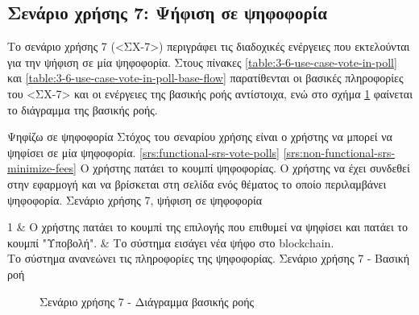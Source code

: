 \subsection{Σενάριο χρήσης 7: Ψήφιση σε ψηφοφορία} \label{subsection:3-6-use-case-vote-in-poll}

Το σενάριο χρήσης 7 (<ΣΧ-7>) περιγράφει τις διαδοχικές ενέργειες που εκτελούνται για την ψήφιση σε μία ψηφοφορία. Στους πίνακες \ref{table:3-6-use-case-vote-in-poll} και \ref{table:3-6-use-case-vote-in-poll-base-flow} παρατίθενται οι βασικές πληροφορίες του <ΣΧ-7> και οι ενέργειες της βασικής ροής αντίστοιχα, ενώ στο σχήμα \ref{figure:3-6-use-case-vote-in-poll-base-flow-sequence-diagram} φαίνεται το διάγραμμα της βασικής ροής.

\useCaseTable
{Ψηφίζω σε ψηφοφορία}
{Στόχος του σεναρίου χρήσης είναι ο χρήστης να μπορεί να ψηφίσει σε μία ψηφοφορία.}
{\ref{srs:functional-srs-vote-polls}}
{\ref{srs:non-functional-srs-minimize-fees}}
{Ο χρήστης πατάει το κουμπί ψηφοφορίας.}
{Ο χρήστης να έχει συνδεθεί στην εφαρμογή και να βρίσκεται στη σελίδα ενός θέματος το οποίο περιλαμβάνει ψηφοφορία.}
{Σενάριο χρήσης 7, ψήφιση σε ψηφοφορία}
{\label{table:3-6-use-case-vote-in-poll}}


\useCaseBaseFlowTable
{
    1 & Ο χρήστης πατάει το κουμπί της επιλογής που επιθυμεί να ψηφίσει και πατάει το κουμπί "Υποβολή". & Το σύστημα εισάγει νέα ψήφο στο blockchain. \\ [0.5ex]
}
{Το σύστημα ανανεώνει τις πληροφορίες της ψηφοφορίας.}
{Σενάριο χρήσης 7 - Βασική ροή}
{\label{table:3-6-use-case-vote-in-poll-base-flow}}

\begin{figure}[H]
    \centering
    
    \caption{Σενάριο χρήσης 7 - Διάγραμμα βασικής ροής}
    \label{figure:3-6-use-case-vote-in-poll-base-flow-sequence-diagram}
\end{figure}
\vspace{2\baselineskip}